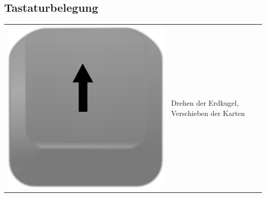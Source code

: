 \documentclass[10pt]{scrreprt}
\begin{document}
\subsection*{Tastaturbelegung}
\begin{tabular}{|>{\centering \arraybackslash}m{3cm}|m{9cm}|}
\hline
\rule[-1ex]{0pt}{7ex}\includegraphics[scale=0.08]{KeyImages/key_arrow_up.eps}& \multirow{3}{*}{Drehen der Erdkugel, Verschieben der Karten}\\

\end{tabular}
\end{document}
